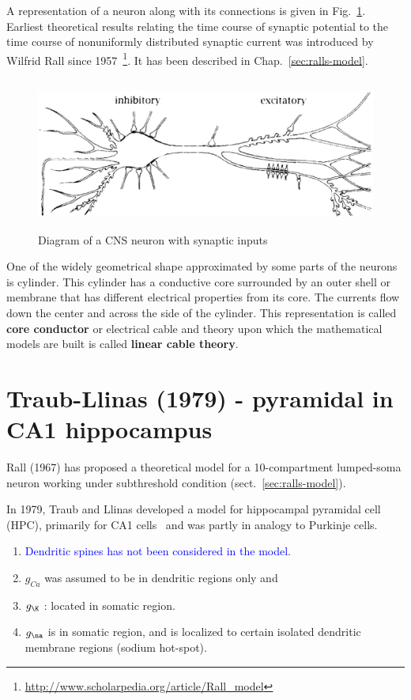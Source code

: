 A representation of a neuron along with its connections is given in
Fig.~\ref{fig:neuron}. Earliest theoretical results relating the time
course of synaptic potential to the time course of nonuniformly
distributed synaptic current was introduced by Wilfrid Rall since
1957~\footnote{\url{http://www.scholarpedia.org/article/Rall_model}}. It
has been described in Chap.~\ref{sec:ralls-model}.

\begin{figure}[hbt]
  \centerline{\includegraphics[height=5cm,
    angle=0]{./images/neuron.eps}}
  \caption{Diagram of a CNS neuron with synaptic inputs}
  \label{fig:neuron}
\end{figure}


One of the widely geometrical shape approximated by some parts of the
neurons is cylinder. This cylinder has a conductive core surrounded by
an outer shell or membrane that has different electrical properties
from its core. The currents flow down the center and across the side
of the cylinder. This representation is called {\bf core conductor} or
electrical cable and theory upon which the mathematical models are
built is called {\bf linear cable theory}.

\section{Traub-Llinas (1979) - pyramidal in CA1 hippocampus}
\label{sec:Traub-Llinas-1979}

Rall (1967) has proposed a theoretical model for a 10-compartment
lumped-soma neuron working under subthreshold condition
(sect.~\ref{sec:ralls-model}). 

In 1979, Traub and Llinas developed a model for hippocampal pyramidal cell
(HPC), primarily for CA1 cells~\citep{traub1979hpc} and was partly in analogy
to Purkinje cells.
\begin{enumerate}

  \item  \textcolor{blue}{Dendritic spines has not been considered in the model}.

  \item $g_{Ca}$ was assumed to be in dendritic regions only and 
  
  \item $g_\K$ : located in somatic region. 
  
  \item $g_\na$ is in somatic region, and is localized to certain isolated
  dendritic membrane regions (sodium hot-spot).

\end{enumerate}

